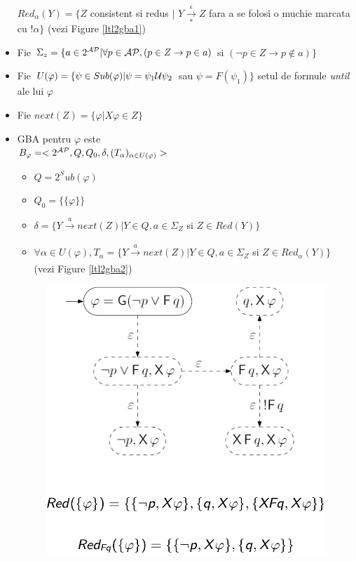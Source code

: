 \documentclass[10pt,a4paper,twocolumn]{report}
\begin{document}
\begin{itemize}
	$Red_\alpha(Y) = \{Z$ consistent si redus $|$ $Y\xrightarrow[*]{\epsilon} Z$ fara a se folosi o muchie marcata cu $!\alpha\}$ (vezi Figure \ref{ltl2gba1})
	\item Fie $\Sigma_z = \{a \in 2^{\mathcal{AP}} | \forall p \in \mathcal{AP}, (p \in Z \rightarrow p \in a)$ si $(\neg p \in Z \rightarrow p \not\in a)\}$
	\item Fie $U(\varphi) = \{\psi \in Sub(\varphi) | \psi = \psi_1\mathcal{U}\psi_2$ sau $\psi = F(\psi_1) \}$ setul de formule \textit{until} ale lui $\varphi$
	\item Fie $next(Z) = \{ \varphi | X \varphi \in Z \}$
	\item GBA pentru $\varphi$ este\\$B_\varphi = <2^{\mathcal{AP}}, Q, Q_0, \delta, (T_\alpha)_{\alpha \in U(\varphi)}>$
	\begin{itemize}
		\item $Q = 2^Sub(\varphi)$
		\item $Q_0 = \{\{\varphi\}\}$
		\item $\delta = \{Y \xrightarrow[]{a} next(Z) | Y \in Q, a \in \Sigma_Z$ si $Z \in Red(Y)\}$
		\item $\forall \alpha \in U(\varphi), T_\alpha = \{Y \xrightarrow[]{a} next(Z) | Y \in Q, a \in \Sigma_Z$ si $Z \in Red_\alpha(Y)\}$ (vezi Figure \ref{ltl2gba2})
	\end{itemize}
	\begin{figure}[ht]
	\includegraphics[scale=0.3]{ltl2gba_ex1.png}

\end{figure}
\end{itemize}
\end{document}
